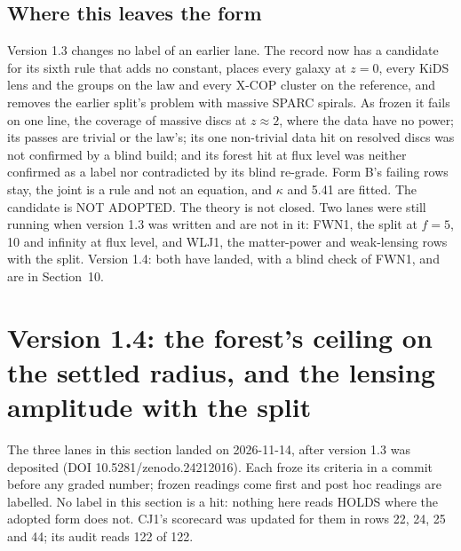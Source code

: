 \documentclass[10pt]{article}
\begin{document}
\subsection{Where this leaves the form}
Version 1.3 changes no label of an earlier lane. The record now has a candidate for its sixth rule that adds no constant, places every galaxy at $z=0$, every KiDS lens and the groups on the law and every X-COP cluster on the reference, and removes the earlier split's problem with massive SPARC spirals. As frozen it fails on one line, the coverage of massive discs at $z\approx2$, where the data have no power; its passes are trivial or the law's; its one non-trivial data hit on resolved discs was not confirmed by a blind build; and its forest hit at flux level was neither confirmed as a label nor contradicted by its blind re-grade. Form B's failing rows stay, the joint is a rule and not an equation, and $\kappa$ and 5.41 are fitted. The candidate is NOT ADOPTED. The theory is not closed. Two lanes were still running when version 1.3 was written and are not in it: FWN1, the split at $f=5$, 10 and infinity at flux level, and WLJ1, the matter-power and weak-lensing rows with the split. Version 1.4: both have landed, with a blind check of FWN1, and are in Section~10.

\section{Version 1.4: the forest's ceiling on the settled radius, and the lensing amplitude with the split}
The three lanes in this section landed on 2026-11-14, after version 1.3 was deposited (DOI 10.5281/zenodo.24212016). Each froze its criteria in a commit before any graded number; frozen readings come first and post hoc readings are labelled. No label in this section is a hit: nothing here reads HOLDS where the adopted form does not. CJ1's scorecard was updated for them in rows 22, 24, 25 and 44; its audit reads 122 of 122.
\end{document}
